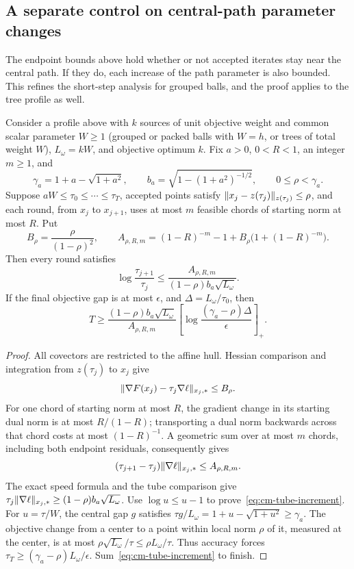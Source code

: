 \subsection{A separate control on central-path parameter changes}

The endpoint bounds above hold whether or not accepted iterates stay
near the central path.  If they do, each increase of the path parameter
is also bounded.  This refines the short-step analysis for grouped
balls, and the proof applies to the tree profile as well.

\begin{proposition}\label{prop:cm-tube}
Consider a profile above with $k$ sources of unit objective weight and
common scalar parameter $W\geq1$ (grouped or packed balls with $W=h$,
or trees of total weight $W$), $L_\omega=kW$, and objective optimum $k$.
Fix $a>0$, $0<R<1$, an integer $m\geq1$, and
\[
 \gamma_a=1+a-\sqrt{1+a^2},\qquad
 b_a=\sqrt{1-(1+a^2)^{-1/2}},\qquad 0\leq\rho<\gamma_a.
\]
Suppose $aW\leq\tau_0\leq\cdots\leq\tau_T$, accepted points satisfy
$\lVert x_j-z(\tau_j)\rVert_{z(\tau_j)}\leq\rho$, and each round, from
$x_j$ to $x_{j+1}$, uses at most $m$ feasible chords of starting norm at
most $R$.
Put
\[
 B_\rho=\frac{\rho}{(1-\rho)^2},\qquad
 A_{\rho,R,m}=(1-R)^{-m}-1+
 B_\rho\bigl(1+(1-R)^{-m}\bigr).
\]
Then every round satisfies
\begin{equation}\label{eq:cm-tube-increment}
 \log\frac{\tau_{j+1}}{\tau_j}
 \leq\frac{A_{\rho,R,m}}{(1-\rho)b_a\sqrt{L_\omega}}.
\end{equation}
If the final objective gap is at most $\epsilon$, and
$\Delta=L_\omega/\tau_0$, then
\begin{equation}\label{eq:cm-tube-count}
 T\geq\frac{(1-\rho)b_a\sqrt{L_\omega}}{A_{\rho,R,m}}
 \left[\log\frac{(\gamma_a-\rho)\Delta}{\epsilon}\right]_+.
\end{equation}
\end{proposition}
\begin{proof}
All covectors are restricted to the affine hull.  Hessian comparison
and integration from $z(\tau_j)$ to $x_j$ give
\[
 \lVert \nabla F(x_j)-\tau_j\nabla\ell\rVert_{x_j,*}\leq B_\rho.
\]
For one chord of starting norm at most $R$, the gradient change in its starting dual norm is
at most $R/(1-R)$; transporting a dual norm backwards across that
chord costs at most $(1-R)^{-1}$.  A geometric sum over at most $m$
chords, including both endpoint residuals, consequently gives
\[
 (\tau_{j+1}-\tau_j)\lVert \nabla\ell\rVert_{x_j,*}
 \leq A_{\rho,R,m}.
\]
The exact speed formula and the tube comparison give
$\tau_j\lVert \nabla\ell\rVert_{x_j,*}
\geq(1-\rho)b_a\sqrt{L_\omega}$.
Use $\log u\leq u-1$ to prove~\eqref{eq:cm-tube-increment}.
For $u=\tau/W$, the central gap $g$ satisfies
$\tau g/L_\omega=1+u-\sqrt{1+u^2}\geq\gamma_a$.
The objective change from a center to a point within local norm $\rho$
of it, measured at the center, is
at most $\rho\sqrt{L_\omega}/\tau\leq\rho L_\omega/\tau$.
Thus accuracy forces
$\tau_T\geq(\gamma_a-\rho)L_\omega/\epsilon$.
Sum~\eqref{eq:cm-tube-increment} to finish.
\end{proof}

